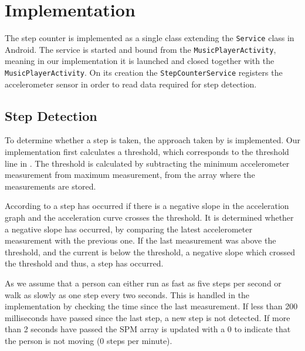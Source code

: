\section{Implementation}
The step counter is implemented as a single class extending the \texttt{Service} class in Android. The service is started and bound from the \texttt{MusicPlayerActivity}, meaning in our implementation it is launched and closed together with the \texttt{MusicPlayerActivity}. On its creation the \texttt{StepCounterService} registers the accelerometer sensor in order to read data required for step detection.

\subsection{Step Detection}\label{sec:stepCnt}
To determine whether a step is taken, the approach taken by \citet{zhao:pedometer} is implemented. Our implementation first calculates a threshold, which corresponds to the threshold line in . The threshold is calculated by subtracting the minimum accelerometer measurement from maximum measurement, from the array where the measurements are stored.

According to \citet[p. 2]{zhao:pedometer} a step has occurred if there is a negative slope in the acceleration graph and the acceleration curve crosses the threshold. It is determined whether a negative slope has occurred, by comparing the latest accelerometer measurement with the previous one. If the last measurement was above the threshold, and the current is below the threshold, a negative slope which crossed the threshold and thus, a step has occurred.

As \citet[p. 2]{zhao:pedometer} we assume that a person can either run as fast as five steps per second or walk as slowly as one step every two seconds. This is handled in the implementation by checking the time since the last measurement. If less than 200 milliseconds have passed since the last step, a new step is not detected. If more than 2 seconds have passed the SPM array is updated with a 0 to indicate that the person is not moving (0 steps per minute).


